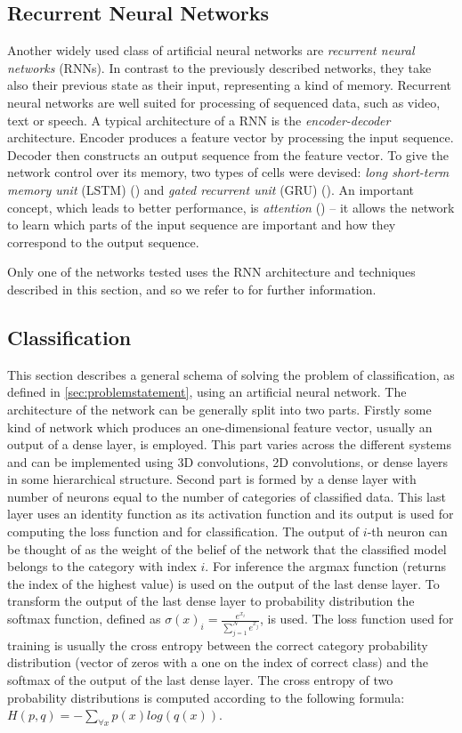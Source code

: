 \subsection{Recurrent Neural Networks}
\label{sec:rnns}
Another widely used class of artificial neural networks are \textit{recurrent neural networks} (RNNs). In contrast to the previously described networks, they take  also their previous state as their input, representing a kind of memory. Recurrent neural networks are well suited for processing of sequenced data, such as video, text or speech. A typical architecture of a RNN is the \textit{encoder-decoder} architecture. Encoder produces a feature vector by processing the input sequence. Decoder then constructs an output sequence from the feature vector. To give the network control over its memory, two types of cells were devised: \textit{long short-term memory unit} (LSTM) (\cite{hochreiter_long_1997}) and \textit{gated recurrent unit} (GRU) (\cite{cho_learning_2014}). An important concept, which leads to better performance, is \textit{attention} (\cite{bahdanau_neural_2014}) -- it allows the network to learn which parts of the input sequence are important and how they correspond to the output sequence.\par
Only one of the networks tested uses the RNN architecture and techniques described in this section, and  so we refer to \cite{goodfellow_deep_2016} for further information. 

\subsection{Classification}
This section describes a general schema of solving the problem of classification, as defined in \autoref{sec:problemstatement}, using an artificial neural network. The architecture of the network can be generally split into two parts. Firstly some kind of network which produces an one-dimensional feature vector, usually an output of a dense layer, is employed. This part varies across the different systems and can be implemented using 3D convolutions, 2D convolutions, or dense layers in some hierarchical structure.
Second part is formed by a dense layer with number of neurons equal to the number of categories of classified data. This last layer uses an identity function as its activation function and its output is used for computing the loss function and for classification. The output of $i$-th neuron can be thought of as the weight of the belief of the network that the classified model belongs to the category with index $i$. For inference the argmax function (returns the index of the highest value) is used on the output of the last dense layer. To transform the output of the last dense layer to probability distribution the softmax function, defined as $\sigma(x)_i = \frac{e^{x_i}}{\sum_{j=1}^{N}{e^{x_j}}} $, is used. The loss function used for training is usually the cross entropy between the correct category probability distribution (vector of zeros with a one on the index of correct class) and the softmax of the output of the last dense layer. The cross entropy of two probability distributions is computed according to the following formula: $H(p,q) = - \sum_{\forall x}{p(x)log(q(x))}$. 

